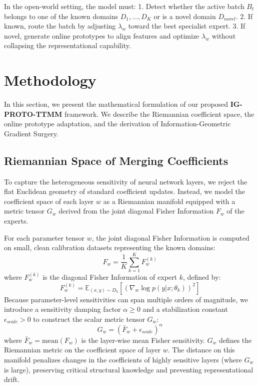 \documentclass{article}
\theoremstyle{plain}
\theoremstyle{definition}
\theoremstyle{remark}
\begin{document}
In the open-world setting, the model must:
1. Detect whether the active batch $B_t$ belongs to one of the known domains $D_1, \dots, D_K$ or is a novel domain $D_{novel}$.
2. If known, route the batch by adjusting $\lambda_w$ toward the best specialist expert.
3. If novel, generate online prototypes to align features and optimize $\lambda_w$ without collapsing the representational capability.

\section{Methodology}
\label{method}

In this section, we present the mathematical formulation of our proposed \textbf{IG-PROTO-TTMM} framework. We describe the Riemannian coefficient space, the online prototype adaptation, and the derivation of Information-Geometric Gradient Surgery.

\subsection{Riemannian Space of Merging Coefficients}
To capture the heterogeneous sensitivity of neural network layers, we reject the flat Euclidean geometry of standard coefficient updates. Instead, we model the coefficient space of each layer $w$ as a Riemannian manifold equipped with a metric tensor $G_w$ derived from the joint diagonal Fisher Information $F_w$ of the experts.

For each parameter tensor $w$, the joint diagonal Fisher Information is computed on small, clean calibration datasets representing the known domains:
\begin{equation}
  F_w = \frac{1}{K} \sum_{k=1}^K F_w^{(k)}
\end{equation}
where $F_w^{(k)}$ is the diagonal Fisher Information of expert $k$, defined by:
\begin{equation}
  F_w^{(k)} = \mathbb{E}_{(x,y) \sim D_k} \left[ \left(\nabla_w \log p(y|x; \theta_k)\right)^2 \right]
\end{equation}
Because parameter-level sensitivities can span multiple orders of magnitude, we introduce a sensitivity damping factor $\alpha \geq 0$ and a stabilization constant $\epsilon_{scale} > 0$ to construct the scalar metric tensor $G_w$:
\begin{equation}
  G_w = \left(\bar{F}_w + \epsilon_{scale}\right)^\alpha
\end{equation}
where $\bar{F}_w = \text{mean}(F_w)$ is the layer-wise mean Fisher sensitivity. $G_w$ defines the Riemannian metric on the coefficient space of layer $w$. The distance on this manifold penalizes changes in the coefficients of highly sensitive layers (where $G_w$ is large), preserving critical structural knowledge and preventing representational drift.
\end{document}
